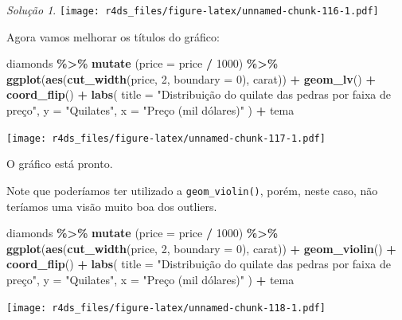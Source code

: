 \documentclass[
]{latex/krantz}
\newenvironment{Shaded}{\begin{snugshade}}{\end{snugshade}}
\newcommand{\AttributeTok}[1]{\textcolor[rgb]{0.13,0.29,0.53}{#1}}
\newcommand{\DecValTok}[1]{\textcolor[rgb]{0.00,0.00,0.81}{#1}}
\newcommand{\FunctionTok}[1]{\textcolor[rgb]{0.13,0.29,0.53}{\textbf{#1}}}
\newcommand{\NormalTok}[1]{#1}
\newcommand{\SpecialCharTok}[1]{\textcolor[rgb]{0.81,0.36,0.00}{\textbf{#1}}}
\newcommand{\StringTok}[1]{\textcolor[rgb]{0.31,0.60,0.02}{#1}}
\theoremstyle{definition}
\theoremstyle{definition}
\theoremstyle{definition}
\theoremstyle{definition}
\theoremstyle{remark}
\newtheorem*{solution}{Solução}
\begin{document}
\begin{solution}
\texttt{[image: r4ds\_files/figure-latex/unnamed-chunk-116-1.pdf]}

Agora vamos melhorar os títulos do gráfico:

\begin{Shaded}
\begin{Highlighting}[]
\NormalTok{diamonds }\SpecialCharTok{\%\textgreater{}\%}
    \FunctionTok{mutate}\NormalTok{ (}\AttributeTok{price =}\NormalTok{ price }\SpecialCharTok{/} \DecValTok{1000}\NormalTok{) }\SpecialCharTok{\%\textgreater{}\%}
    \FunctionTok{ggplot}\NormalTok{(}\FunctionTok{aes}\NormalTok{(}\FunctionTok{cut\_width}\NormalTok{(price, }\DecValTok{2}\NormalTok{, }\AttributeTok{boundary =} \DecValTok{0}\NormalTok{), carat)) }\SpecialCharTok{+}
        \FunctionTok{geom\_lv}\NormalTok{() }\SpecialCharTok{+}
        \FunctionTok{coord\_flip}\NormalTok{() }\SpecialCharTok{+}
        \FunctionTok{labs}\NormalTok{(}
            \AttributeTok{title =} \StringTok{"Distribuição do quilate das pedras por faixa de preço"}\NormalTok{,}
            \AttributeTok{y =} \StringTok{"Quilates"}\NormalTok{,}
            \AttributeTok{x =} \StringTok{"Preço (mil dólares)"}
\NormalTok{        ) }\SpecialCharTok{+}
\NormalTok{        tema}
\end{Highlighting}
\end{Shaded}

\texttt{[image: r4ds\_files/figure-latex/unnamed-chunk-117-1.pdf]}

O gráfico está pronto.

Note que poderíamos ter utilizado a \texttt{geom\_violin()}, porém, neste caso, não teríamos uma visão muito boa dos outliers.

\begin{Shaded}
\begin{Highlighting}[]
\NormalTok{diamonds }\SpecialCharTok{\%\textgreater{}\%}
    \FunctionTok{mutate}\NormalTok{ (}\AttributeTok{price =}\NormalTok{ price }\SpecialCharTok{/} \DecValTok{1000}\NormalTok{) }\SpecialCharTok{\%\textgreater{}\%}
    \FunctionTok{ggplot}\NormalTok{(}\FunctionTok{aes}\NormalTok{(}\FunctionTok{cut\_width}\NormalTok{(price, }\DecValTok{2}\NormalTok{, }\AttributeTok{boundary =} \DecValTok{0}\NormalTok{), carat)) }\SpecialCharTok{+}
        \FunctionTok{geom\_violin}\NormalTok{() }\SpecialCharTok{+}
        \FunctionTok{coord\_flip}\NormalTok{() }\SpecialCharTok{+}
        \FunctionTok{labs}\NormalTok{(}
            \AttributeTok{title =} \StringTok{"Distribuição do quilate das pedras por faixa de preço"}\NormalTok{,}
            \AttributeTok{y =} \StringTok{"Quilates"}\NormalTok{,}
            \AttributeTok{x =} \StringTok{"Preço (mil dólares)"}
\NormalTok{        ) }\SpecialCharTok{+}
\NormalTok{        tema}
\end{Highlighting}
\end{Shaded}

\texttt{[image: r4ds\_files/figure-latex/unnamed-chunk-118-1.pdf]}
\end{solution}
\end{document}
